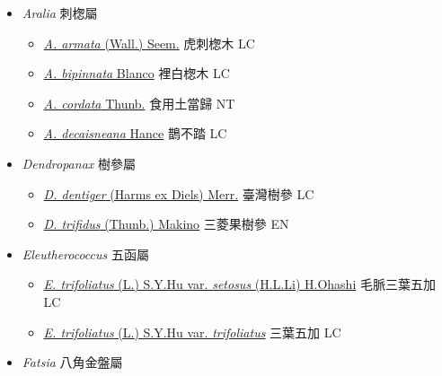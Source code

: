 
  \begin{itemize}
 \item[] \textit{Aralia} 刺楤屬
                                
  \begin{itemize}
        \item[] \href{http://www.theplantlist.org/tpl1.1/search?q=Aralia+armata}{\textit{A. armata} (Wall.) Seem.}   虎刺楤木   LC
        \item[] \href{http://www.theplantlist.org/tpl1.1/search?q=Aralia+bipinnata}{\textit{A. bipinnata} Blanco}   裡白楤木   LC
        \item[] \href{http://www.theplantlist.org/tpl1.1/search?q=Aralia+cordata}{\textit{A. cordata} Thunb.}   食用土當歸   NT
        \item[] \href{http://www.theplantlist.org/tpl1.1/search?q=Aralia+decaisneana}{\textit{A. decaisneana} Hance}   鵲不踏   LC
  \end{itemize}
 \item[] \textit{Dendropanax} 樹參屬
                                
  \begin{itemize}
        \item[] \href{http://www.theplantlist.org/tpl1.1/search?q=Dendropanax+dentiger}{\textit{D. dentiger} (Harms ex Diels) Merr.}   臺灣樹參   LC
        \item[] \href{http://www.theplantlist.org/tpl1.1/search?q=Dendropanax+trifidus}{\textit{D. trifidus} (Thunb.) Makino}   三菱果樹參   EN
  \end{itemize}
 \item[] \textit{Eleutherococcus} 五函屬
                                
  \begin{itemize}
        \item[] \href{http://www.theplantlist.org/tpl1.1/search?q=Eleutherococcus+trifoliatus+var.+setosus}{\textit{E. trifoliatus} (L.) S.Y.Hu var. \textit{setosus} (H.L.Li) H.Ohashi}   毛脈三葉五加   LC
        \item[] \href{http://www.theplantlist.org/tpl1.1/search?q=Eleutherococcus+trifoliatus+var.+trifoliatus}{\textit{E. trifoliatus} (L.) S.Y.Hu var. \textit{trifoliatus}}   三葉五加   LC
  \end{itemize}
 \item[] \textit{Fatsia} 八角金盤屬
                                

\end{itemize}
